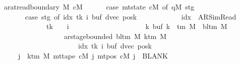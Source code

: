 \begin{isabellebody}
\ \ {\isachardoublequoteopen}ar{\isacharunderscore}{\kern0pt}at{\isacharunderscore}{\kern0pt}read{\isacharunderscore}{\kern0pt}boundary\ M\ cM{\isacharprime}{\kern0pt}\ {\isasymlongleftrightarrow}\isanewline
\ \ \ \ \ {\isacharparenleft}{\kern0pt}case\ mt{\isacharunderscore}{\kern0pt}state\ cM{\isacharprime}{\kern0pt}\ of\ {\isacharparenleft}{\kern0pt}qM{\isacharprime}{\kern0pt}{\isacharcomma}{\kern0pt}\ stg{\isacharparenright}{\kern0pt}\ {\isasymRightarrow}\isanewline
\ \ \ \ \ \ \ \ {\isacharparenleft}{\kern0pt}case\ stg\ of\ {\isacharparenleft}{\kern0pt}idx{\isacharcomma}{\kern0pt}\ tk{\isacharcomma}{\kern0pt}\ i{\isacharcomma}{\kern0pt}\ buf{\isacharcomma}{\kern0pt}\ dvec{\isacharcomma}{\kern0pt}\ posk{\isacharparenright}{\kern0pt}\ {\isasymRightarrow}\isanewline
\ \ \ \ \ \ \ \ \ \ \ idx\ {\isacharequal}{\kern0pt}\ AR{\isacharunderscore}{\kern0pt}SimRead\isanewline
\ \ \ \ \ \ \ \ \ \ \ \ \ {\isasymlongrightarrow}\ {\isacharparenleft}{\kern0pt}tk\ {\isacharequal}{\kern0pt}\ {}\ {\isasymand}\ i\ {\isacharequal}{\kern0pt}\ {}\isanewline
\ \ \ \ \ \ \ \ \ \ \ \ \ \ \ \ \ \ {\isasymand}\ {\isacharparenleft}{\kern0pt}{\isasymforall}k{\isachardot}{\kern0pt}\ buf\ k\ {\isasymin}\ {\isasymGamma}{\isacharunderscore}{\kern0pt}tm\ M\ {\isasymunion}\ {\isacharbraceleft}{\kern0pt}bl{\isacharunderscore}{\kern0pt}tm\ M{\isacharbraceright}{\kern0pt}{\isacharparenright}{\kern0pt}\isanewline
\ \ \ \ \ \ \ \ \ \ \ \ \ \ \ \ \ \ {\isasymand}\ ar{\isacharunderscore}{\kern0pt}stage{\isacharunderscore}{\kern0pt}bounded\ {\isacharparenleft}{\kern0pt}bl{\isacharunderscore}{\kern0pt}tm\ M{\isacharparenright}{\kern0pt}\ {\isacharparenleft}{\kern0pt}k{\isacharunderscore}{\kern0pt}tm\ M{\isacharparenright}{\kern0pt}\isanewline
\ \ \ \ \ \ \ \ \ \ \ \ \ \ \ \ \ \ \ \ \ \ \ {\isacharparenleft}{\kern0pt}idx{\isacharcomma}{\kern0pt}\ tk{\isacharcomma}{\kern0pt}\ i{\isacharcomma}{\kern0pt}\ buf{\isacharcomma}{\kern0pt}\ dvec{\isacharcomma}{\kern0pt}\ posk{\isacharparenright}{\kern0pt}{\isacharparenright}{\kern0pt}{\isacharparenright}{\kern0pt}{\isacharparenright}{\kern0pt}\isanewline
\ \ \ \ \ {\isasymand}\ {\isacharparenleft}{\kern0pt}{\isasymforall}j\ {\isasymge}\ k{\isacharunderscore}{\kern0pt}tm\ M{\isachardot}{\kern0pt}\ mt{\isacharunderscore}{\kern0pt}tape\ cM{\isacharprime}{\kern0pt}\ j\ {\isacharparenleft}{\kern0pt}mt{\isacharunderscore}{\kern0pt}pos\ cM{\isacharprime}{\kern0pt}\ j{\isacharparenright}{\kern0pt}\ {\isacharequal}{\kern0pt}\ BLANK{}{\isacharparenright}{\kern0pt}{\isachardoublequoteclose}\isanewline
%
\isadelimtheory
\isanewline
%
\endisadelimtheory
%
\isatagtheory
{}\isamarkupfalse%
%
\endisatagtheory
{\isafoldtheory}%
%
\isadelimtheory
%
\endisadelimtheory
%
\end{isabellebody}%
